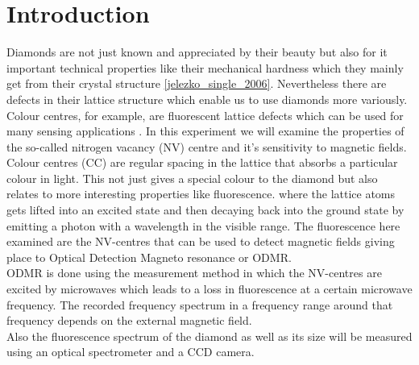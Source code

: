 \section{Introduction}

Diamonds are not just known and appreciated by their beauty but also for it important technical properties like their mechanical hardness which they mainly get from their crystal structure \ref{jelezko_single_2006}. Nevertheless there are defects in their lattice structure which enable us to use diamonds more variously. Colour centres, for example, are fluorescent lattice defects which can be used for many sensing applications \cite{anleitung}. In this experiment we will examine the properties of the so-called nitrogen vacancy (NV) centre and it's sensitivity to magnetic fields.\\

Colour centres (CC) are  regular spacing in the lattice that absorbs a particular colour in light. This not just gives a special colour to the diamond but also relates to more interesting properties like fluorescence. where the lattice atoms gets lifted into an excited state and then decaying back into the ground state by emitting a photon with a wavelength in the visible range. The fluorescence here examined are the NV-centres that can be used to detect magnetic fields giving place to Optical Detection Magneto resonance or ODMR.\\

ODMR is done using the measurement method in which the NV-centres are excited by microwaves which leads to a loss in fluorescence at a certain microwave frequency. The recorded frequency spectrum in a frequency range around that frequency depends on the external magnetic field.\\

Also the fluorescence spectrum of the diamond as well as its size will be measured using an optical spectrometer and a CCD camera.